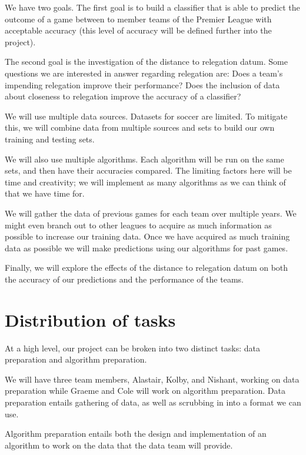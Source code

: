 \documentclass[conference]{IEEEtran}
\begin{document}
We have two goals. The first goal is to build a classifier that is  able to predict the outcome of a game between to member teams of the Premier League with acceptable accuracy (this level of accuracy will be defined further into the project).

The second goal is the investigation of the distance to relegation datum. Some questions we are interested in answer regarding relegation are:
Does a team’s impending relegation improve their performance?
Does the inclusion of data about closeness to relegation improve the accuracy of a classifier?

We will use multiple data sources. Datasets for soccer are limited. To mitigate this, we will combine data from multiple sources and sets to build our own training and testing sets.

We will also use multiple algorithms. Each algorithm will be run on the same sets, and then have their accuracies compared.  The limiting factors here will be time and creativity; we will implement as many algorithms as we can think of that we have time for.

We will gather the data of previous games for each team over multiple years. We might even branch out to other leagues to acquire as much information as possible to increase our training data. Once we have acquired as much training data as possible we will make predictions using our algorithms for past games.

Finally, we will explore the effects of the distance to relegation datum on both the accuracy of our predictions and the performance of the teams.
\section{Distribution of tasks}
At a high level, our project can be broken into two distinct tasks: data preparation and algorithm preparation.

We will have three team members, Alastair, Kolby, and Nishant, working on data preparation while Graeme and Cole will work on algorithm preparation.
Data preparation entails gathering of data, as well as scrubbing in into a format we can use.

Algorithm preparation entails both the design and implementation of an algorithm to work on the data that the data team will provide.
\clearpage
\end{document}
